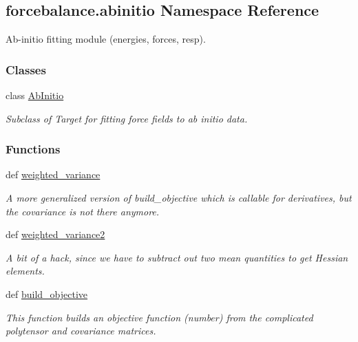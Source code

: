 \hypertarget{namespaceforcebalance_1_1abinitio}{\subsection{forcebalance.\-abinitio Namespace Reference}
\label{namespaceforcebalance_1_1abinitio}
}


Ab-\/initio fitting module (energies, forces, resp).  


\subsubsection*{Classes}
\begin{DoxyCompactItemize}
\item 
class \hyperlink{classforcebalance_1_1abinitio_1_1AbInitio}{Ab\-Initio}
\begin{DoxyCompactList}\small\item\em Subclass of Target for fitting force fields to ab initio data. \end{DoxyCompactList}\end{DoxyCompactItemize}
\subsubsection*{Functions}
\begin{DoxyCompactItemize}
\item 
def \hyperlink{namespaceforcebalance_1_1abinitio_aba970cb59bab95eec79027ea05655110}{weighted\-\_\-variance}
\begin{DoxyCompactList}\small\item\em A more generalized version of build\-\_\-objective which is callable for derivatives, but the covariance is not there anymore. \end{DoxyCompactList}\item 
def \hyperlink{namespaceforcebalance_1_1abinitio_ab9554761125a4ec7c3c13d6ae4ea537d}{weighted\-\_\-variance2}
\begin{DoxyCompactList}\small\item\em A bit of a hack, since we have to subtract out two mean quantities to get Hessian elements. \end{DoxyCompactList}\item 
def \hyperlink{namespaceforcebalance_1_1abinitio_aadd1d6c5a34c82d495d6be7380b73601}{build\-\_\-objective}
\begin{DoxyCompactList}\small\item\em This function builds an objective function (number) from the complicated polytensor and covariance matrices. \end{DoxyCompactList}\end{DoxyCompactItemize}


